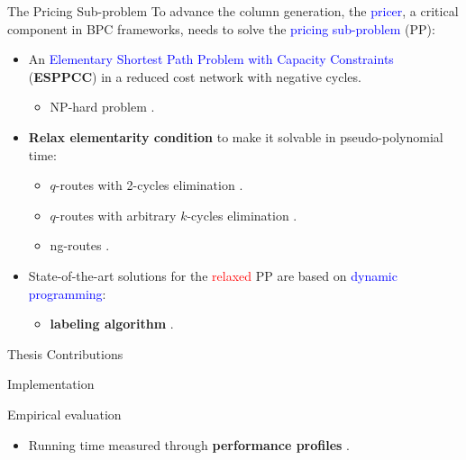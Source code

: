 \begin{frame}{The Pricing Sub-problem}
	To advance the column generation, the \textcolor{blue}{pricer}, a critical component in BPC frameworks, needs to solve the \textcolor{blue}{pricing sub-problem} (PP):
	\begin{itemize}
		\item An \textcolor{blue}{Elementary Shortest Path Problem with Capacity Constraints} (\textbf{ESPPCC}) in a reduced cost network with negative cycles.
		      \begin{itemize}
			      \item NP-hard problem \parencite{dror1994}.
		      \end{itemize}
		\item \textbf{Relax elementarity condition} to make it solvable in pseudo-polynomial time:
		      \begin{itemize}
			      \item $q$-routes with 2-cycles elimination \parencite{christofides1969}.
			      \item $q$-routes with arbitrary $k$-cycles elimination \parencite{christofides1969}.
			      \item ng-routes \parencite{baldacci2011}.
		      \end{itemize}
		\item State-of-the-art solutions for the \textcolor{red}{relaxed} PP are based on \textcolor{blue}{dynamic programming}:
		      \begin{itemize}
			      \item \textbf{labeling algorithm} \parencite{desrochers1992, feillet2004}.
		      \end{itemize}
	\end{itemize}
\end{frame}

\begin{frame}{Thesis Contributions}
\end{frame}

\begin{frame}{Implementation}
\end{frame}

\begin{frame}{Empirical evaluation}
	\begin{itemize}
		\item Running time measured through \textbf{performance profiles} \parencite{dolan2002}.
	\end{itemize}
\end{frame}

